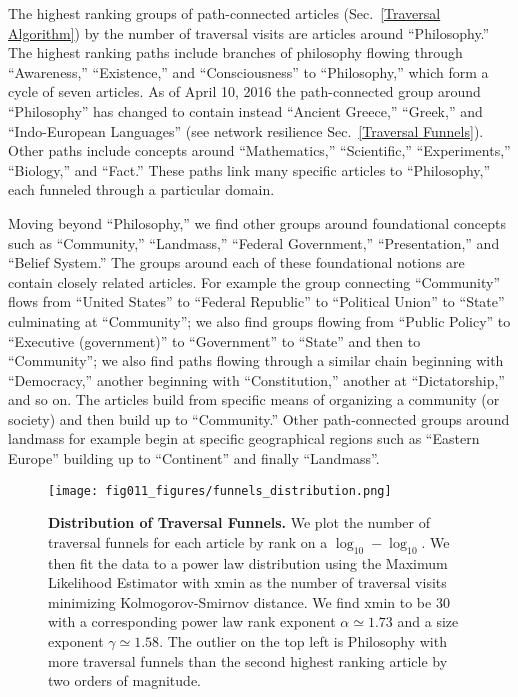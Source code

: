 \documentclass[pre,twocolumn,twoside,superscriptaddress,floatfix]{revtex4-1}
\begin{document}
{The highest ranking groups of path-connected articles (Sec.~\ref{Traversal Algorithm}) by the number of traversal visits are articles around ``Philosophy.'' 
The highest ranking paths include branches of philosophy flowing through 
``Awareness,'' ``Existence,'' and ``Consciousness'' to ``Philosophy,'' 
which form a cycle of seven articles. As of April 10, 2016 the path-connected group around
``Philosophy'' has changed to contain instead ``Ancient Greece,'' ``Greek,'' and 
``Indo-European Languages'' (see network resilience Sec.~\ref{Traversal Funnels}).
Other paths
include concepts around ``Mathematics,'' ``Scientific,'' ``Experiments,'' 
``Biology,'' and ``Fact.''
These paths link many specific articles to ``Philosophy,'' each funneled through a particular domain.

Moving beyond ``Philosophy,'' we find other groups around 
foundational concepts such as ``Community,'' ``Landmass,'' ``Federal Government,'' 
``Presentation,'' and ``Belief System.'' 
The groups around each of these foundational notions are 
contain closely related articles. For example the group connecting
``Community''
flows from ``United States'' to ``Federal Republic'' to ``Political Union'' to ``State'' culminating at ``Community''; we also find groups flowing from 
``Public Policy'' to ``Executive (government)'' to ``Government'' to ``State'' and then 
to ``Community''; we also find paths flowing through a similar chain beginning
with ``Democracy,'' another beginning with ``Constitution,'' another at 
``Dictatorship,'' and so on. The articles build from specific means of organizing
a community (or society) and then build up to ``Community.'' 
Other path-connected groups around landmass for example begin at specific geographical regions
such as ``Eastern Europe'' building up to ``Continent'' and finally ``Landmass''.

\begin{figure}[tp!]
  \texttt{[image: fig011\_figures/funnels\_distribution.png]}
  \caption{
    \textbf{Distribution of Traversal Funnels.}
    We plot the number of traversal funnels for each article by rank on a $\log_{10}-\log_{10}$. We then fit the data to a power law 
    distribution using the Maximum Likelihood Estimator with xmin as the number of traversal visits minimizing Kolmogorov-Smirnov distance. We find xmin to be 30 with a corresponding power law rank exponent $\alpha \simeq 1.73$ and a size exponent $\gamma \simeq 1.58$.
    The outlier on the top left is Philosophy with more traversal funnels than the second highest ranking article by two orders of magnitude.
}
  \label{fig:Funnels Distribution}
\end{figure}

}
\end{document}
